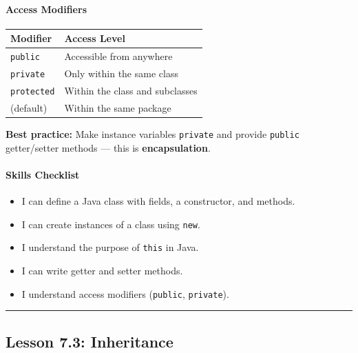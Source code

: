\documentclass[
  justified,
  openright,
]{tufte-book}
\let\subsubsection\paragraph
\let\paragraph\paragraph
\let\subsubsection\paragraph
\let\paragraph\paragraph
\providecommand{\tightlist}{%
  \setlength{\itemsep}{0pt}\setlength{\parskip}{0pt}}
\begin{document}
\subsubsection{Access Modifiers}\label{access-modifiers}

{\def\LTcaptype{none} %
\begin{longtable}[]{@{}ll@{}}
\toprule\noalign{}
Modifier & Access Level \\
\midrule\noalign{}
\endhead
\bottomrule\noalign{}
\endlastfoot
\texttt{public} & Accessible from anywhere \\
\texttt{private} & Only within the same class \\
\texttt{protected} & Within the class and subclasses \\
(default) & Within the same package \\
\end{longtable}
}

\textbf{Best practice:} Make instance variables \texttt{private} and
provide \texttt{public} getter/setter methods --- this is
\textbf{encapsulation}.

\subsubsection{Skills Checklist}\label{skills-checklist-15}

\begin{itemize}
\tightlist
\item[$\square$]
  I can define a Java class with fields, a constructor, and methods.
\item[$\square$]
  I can create instances of a class using \texttt{new}.
\item[$\square$]
  I understand the purpose of \texttt{this} in Java.
\item[$\square$]
  I can write getter and setter methods.
\item[$\square$]
  I understand access modifiers (\texttt{public}, \texttt{private}).
\end{itemize}

\begin{center}\rule{0.5\linewidth}{0.5pt}\end{center}

\subsection{Lesson 7.3: Inheritance}\label{lesson-7.3-inheritance}
\end{document}
